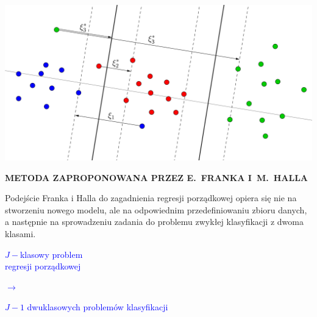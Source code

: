 \documentclass[11pt,usenames,dvipsnames,svgnames,x11names]{beamer}
\theoremstyle{plain}
\theoremstyle{definition}
\theoremstyle{remark}
\begin{document}
\begin{frame}
\centering
\includegraphics[width=\textwidth]{svm3.png}
\end{frame}

\begin{frame}
\Huge
\centering
\textbf{METODA ZAPROPONOWANA PRZEZ E.~FRANKA I~M.~HALLA}
\end{frame}

\begin{frame}
Podejście Franka i Halla do zagadnienia regresji porządkowej opiera się nie na stworzeniu nowego modelu, ale na odpowiednim przedefiniowaniu zbioru danych, a następnie na sprowadzeniu zadania do problemu zwykłej klasyfikacji z dwoma klasami. 

\vspace{10mm}
\begin{minipage}[c]{0.35\textwidth}
\textcolor{blue}{$J-$klasowy problem \\regresji porządkowej}
\end{minipage}
\begin{minipage}[c]{0.2\textwidth}
\centering
\Huge
\textcolor{blue}{$\longrightarrow$}
\end{minipage}
\begin{minipage}[c]{0.35\textwidth}
\flushright
\textcolor{blue}{$J-1$ dwuklasowych problemów klasyfikacji}
\end{minipage}
\end{frame}
\end{document}
